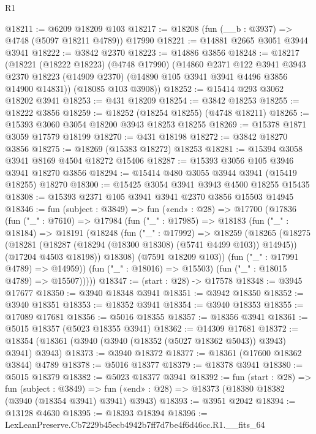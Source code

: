 \begin{lexlean}{R1}
\begin{coremodule}
@18211 := @6209 @18209 @103
@18217 := @18208 (fun (__b : @3937) => @4748 (@5097 @18211 @4789)) @17990
@18221 := @14881 @2665 @3051 @3944 @3941
@18222 := @3842 @2370
@18223 := @14886 @3856
@18248 := @18217
    (@18221
      (@18222 @18223)
      (@4748 @17990)
      (@14860
        @2371
        @122
        @3941
        @3943
        @2370
        @18223
        (@14909 @2370)
        (@14890 @105 @3941 @3941 @4496 @3856 @14900 @14831))
      (@18085 @103 @3908))
@18252 := @15414 @293 @3062 @18202 @3941
@18253 := @431 @18209
@18254 := @3842 @18253
@18255 := @18222 @3856
@18259 := @18252 (@18254 @18255) (@4748 @18211)
@18265 := @15393 @3060 @3054 @18200 @3943 @18253 @18255
@18269 := @15378 @1871 @3059 @17579 @18199
@18270 := @431 @18198
@18272 := @3842 @18270 @3856
@18275 := @18269 (@15383 @18272) @18253
@18281 := @15394 @3058 @3941 @8169 @4504 @18272 @15406
@18287 := @15393 @3056 @105 @3946 @3941 @18270 @3856
@18294 := @15414 @480 @3055 @3944 @3941 (@15419 @18255) @18270
@18300 := @15425 @3054 @3941 @3943 @4500 @18255 @15435
@18308 := @15393 @2371 @105 @3941 @3941 @2370 @3856 @15503 @14945
@18346 := fun (subject : @3849) =>
  fun («end» : @28) =>
  @17700
    (@17836
      (fun ("_" : @7610) =>
      @17984
        (fun ("_" : @17985) =>
        @18183
          (fun ("_" : @18184) =>
          @18191
            (@18248
              (fun ("_" : @17992) =>
              @18259
                (@18265
                  (@18275
                    (@18281 (@18287 (@18294 (@18300 @18308) (@5741 @4499 @103)) @14945))
                    (@17204 @4503 @18198))
                  @18308)
                (@7591 @18209 @103))
              (fun ("_" : @17991 @4789) => @14959))
            (fun ("_" : @18016) => @15503)
            (fun ("_" : @18015 @4789) => @15507)))))
@18347 := (start : @28) -> @17578
@18348 := @3945 @17677
@18350 := @3940 @18348 @3941
@18351 := @3942 @18350
@18352 := @3940 @18351
@18353 := @18352 @3941
@18354 := @3940 @18353
@18355 := @17089 @17681
@18356 := @5016 @18355
@18357 := @18356 @3941
@18361 := @5015 @18357 (@5023 @18355 @3941)
@18362 := @14309 @17681
@18372 := @18354 (@18361 (@3940 (@3940 (@18352 (@5027 @18362 @5043)) @3943) @3941) @3943)
@18373 := @3940 @18372
@18377 := @18361 (@17600 @18362 @3844) @4789
@18378 := @5016 @18377
@18379 := @18378 @3941
@18380 := @5015 @18379
@18382 := @5023 @18377 @3941
@18392 := fun (start : @28) =>
  fun (subject : @3849) =>
  fun («end» : @28) => @18373 (@18380 @18382 (@3940 (@18354 @3941) @3941) @3943)
@18393 := @3951 @2042
@18394 := @13128 @4630
@18395 := @18393 @18394
@18396 := LexLeanPreserve.Cb7229b45ecb4942b7ff7d7be4f6d46cc.R1.__fits_64

\end{coremodule}
\end{lexlean}
